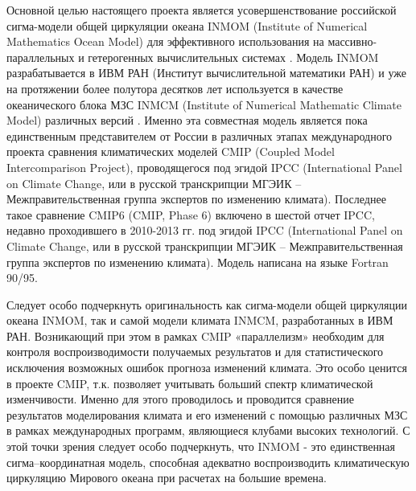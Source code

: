 Основной целью настоящего проекта является усовершенствование российской сигма-модели общей циркуляции океана INMOM
(Institute of Numerical Mathematics Ocean Model) для эффективного использования на массивно-параллельных и гетерогенных вычислительных системах \cite{INMOM}.
Модель INMOM разрабатывается в ИВМ РАН (Институт вычислительной математики РАН) и уже на протяжении более полутора десятков лет используется
в качестве океанического блока МЗС INMCM (Institute of Numerical Mathematic Climate Model) различных версий \cite{VolodinINMCM2013}.
Именно эта совместная модель является пока единственным представителем от России в различных этапах международного проекта сравнения климатических моделей CMIP (Coupled Model Intercomparison Project), проводящегося под эгидой IPCC (International Panel on Climate Change, или в русской транскрипции МГЭИК – Межправительственная группа экспертов по изменению климата).
Последнее такое сравнение CMIP6 (CMIP, Phase 6) включено в шестой отчет IPCC, недавно проходившего в 2010-2013 гг. под эгидой IPCC (International Panel on Climate Change,
или в русской транскрипции МГЭИК – Межправительственная группа экспертов по изменению климата).
Модель написана на языке Fortran 90/95.

Следует особо подчеркнуть оригинальность как сигма-модели общей циркуляции океана INMOM, так и самой модели климата INMCM, разработанных в ИВМ РАН.
Возникающий при этом в рамках CMIP «параллелизм» необходим для контроля воспроизводимости получаемых результатов и для статистического исключения возможных
ошибок прогноза изменений климата. Это особо ценится в проекте CMIP, т.к. позволяет учитывать больший спектр климатической изменчивости.
Именно для этого проводилось и проводится сравнение результатов моделирования климата и его изменений с помощью различных МЗС в рамках международных программ,
являющиеся клубами высоких технологий. С этой точки зрения следует особо подчеркнуть,
что INMOM - это единственная сигма–координатная модель, способная адекватно воспроизводить климатическую циркуляцию Мирового океана при расчетах на большие времена.


